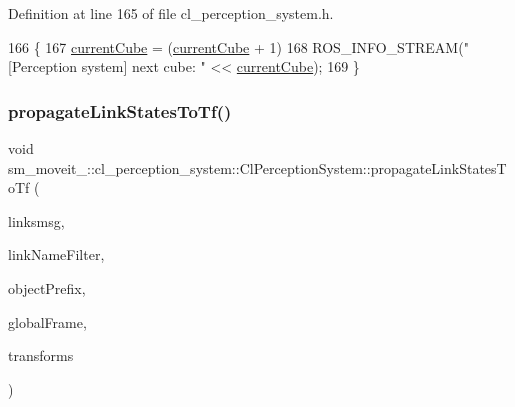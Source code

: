 Definition at line 165 of file cl\+\_\+perception\+\_\+system.\+h.


\begin{DoxyCode}
166   \{
167     \hyperlink{classsm__moveit__3_1_1cl__perception__system_1_1ClPerceptionSystem_ad915fc687481d4157ec40de52f8eaa82}{currentCube} = (\hyperlink{classsm__moveit__3_1_1cl__perception__system_1_1ClPerceptionSystem_ad915fc687481d4157ec40de52f8eaa82}{currentCube} + 1) %
168     ROS\_INFO\_STREAM(\textcolor{stringliteral}{"[Perception system] next cube: "} << \hyperlink{classsm__moveit__3_1_1cl__perception__system_1_1ClPerceptionSystem_ad915fc687481d4157ec40de52f8eaa82}{currentCube});
169   \}
\end{DoxyCode}
\mbox{\label{classsm__moveit__3_1_1cl__perception__system_1_1ClPerceptionSystem_a1084d40600fb5764c48447877a3683ef}} 
\subsubsection{\texorpdfstring{propagate\+Link\+States\+To\+Tf()}{propagateLinkStatesToTf()}}
{\footnotesize\ttfamily void sm\+\_\+moveit\+\_\+::cl\+\_\+perception\+\_\+system\+::\+Cl\+Perception\+System\+::propagate\+Link\+States\+To\+Tf (\begin{DoxyParamCaption}\item[{const gazebo\+\_\+msgs\+::\+Link\+States \&}]{linksmsg,  }\item[{std\+::string}]{link\+Name\+Filter,  }\item[{std\+::string}]{object\+Prefix,  }\item[{std\+::string}]{global\+Frame,  }\item[{std\+::vector$<$ tf\+::\+Stamped\+Transform $>$ \&}]{transforms }\end{DoxyParamCaption})\hspace{0.3cm}{\ttfamily [inline]}}



